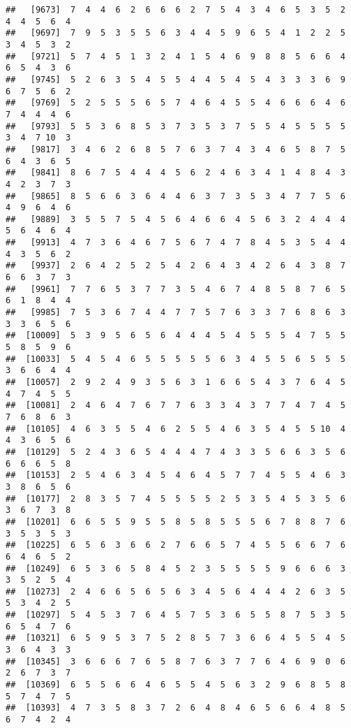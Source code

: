 \documentclass[
]{book}
\begin{document}
\begin{verbatim}
##   [9673]  7  4  4  6  2  6  6  6  2  7  5  4  3  4  6  5  3  5  2  4  4  5  6  4
##   [9697]  7  9  5  3  5  5  6  3  4  4  5  9  6  5  4  1  2  2  5  3  4  5  3  2
##   [9721]  5  7  4  5  1  3  2  4  1  5  4  6  9  8  8  5  6  6  4  6  5  4  3  6
##   [9745]  5  2  6  3  5  4  5  5  4  4  5  4  5  4  3  3  3  6  9  6  7  5  6  2
##   [9769]  5  2  5  5  5  6  5  7  4  6  4  5  5  4  6  6  6  4  6  7  4  4  4  6
##   [9793]  5  5  3  6  8  5  3  7  3  5  3  7  5  5  4  5  5  5  5  3  4  7 10  3
##   [9817]  3  4  6  2  6  8  5  7  6  3  7  4  3  4  6  5  8  7  5  6  4  3  6  5
##   [9841]  8  6  7  5  4  4  4  5  6  2  4  6  3  4  1  4  8  4  3  4  2  3  7  3
##   [9865]  8  5  6  6  3  6  4  4  6  3  7  3  5  3  4  7  7  5  6  4  9  6  4  6
##   [9889]  3  5  5  7  5  4  5  6  4  6  6  4  5  6  3  2  4  4  4  5  6  4  6  4
##   [9913]  4  7  3  6  4  6  7  5  6  7  4  7  8  4  5  3  5  4  4  4  3  5  6  2
##   [9937]  2  6  4  2  5  2  5  4  2  6  4  3  4  2  6  4  3  8  7  6  6  3  7  3
##   [9961]  7  7  6  5  3  7  7  3  5  4  6  7  4  8  5  8  7  6  5  6  1  8  4  4
##   [9985]  7  5  3  6  7  4  4  7  7  5  7  6  3  3  7  6  8  6  3  3  3  6  5  6
##  [10009]  5  3  9  5  6  5  6  4  4  4  5  4  5  5  5  4  7  5  5  5  8  5  9  6
##  [10033]  5  4  5  4  6  5  5  5  5  5  6  3  4  5  5  6  5  5  5  3  6  6  4  4
##  [10057]  2  9  2  4  9  3  5  6  3  1  6  6  5  4  3  7  6  4  5  4  7  4  5  5
##  [10081]  2  4  6  4  7  6  7  7  6  3  3  4  3  7  7  4  7  4  5  7  6  8  6  3
##  [10105]  4  6  3  5  5  4  6  2  5  5  4  6  3  5  4  5  5 10  4  4  3  6  5  6
##  [10129]  5  2  4  3  6  5  4  4  4  7  4  3  3  5  6  6  3  5  6  6  6  6  5  8
##  [10153]  2  5  4  6  3  4  5  4  6  4  5  7  7  4  5  5  4  6  3  3  8  6  5  6
##  [10177]  2  8  3  5  7  4  5  5  5  5  2  5  3  5  4  5  3  5  6  3  6  7  3  8
##  [10201]  6  6  5  5  9  5  5  8  5  8  5  5  5  6  7  8  8  7  6  3  5  3  5  3
##  [10225]  6  5  6  3  6  6  2  7  6  6  5  7  4  5  5  6  6  7  6  6  4  6  5  2
##  [10249]  6  5  3  6  5  8  4  5  2  3  5  5  5  5  9  6  6  6  3  3  5  2  5  4
##  [10273]  2  4  6  6  5  6  5  6  3  4  5  6  4  4  4  2  6  3  5  5  3  4  2  5
##  [10297]  5  4  5  3  7  6  4  5  7  5  3  6  5  5  8  7  5  3  5  6  5  4  7  6
##  [10321]  6  5  9  5  3  7  5  2  8  5  7  3  6  6  4  5  5  4  5  3  6  4  3  3
##  [10345]  3  6  6  6  7  6  5  8  7  6  3  7  7  6  4  6  9  0  6  2  6  7  3  7
##  [10369]  6  5  5  6  6  4  6  5  5  4  5  6  3  2  9  6  8  5  8  5  7  4  7  5
##  [10393]  4  7  3  5  8  3  7  2  6  4  8  4  6  5  6  6  4  8  5  6  7  4  2  4

\end{verbatim}
\end{document}
